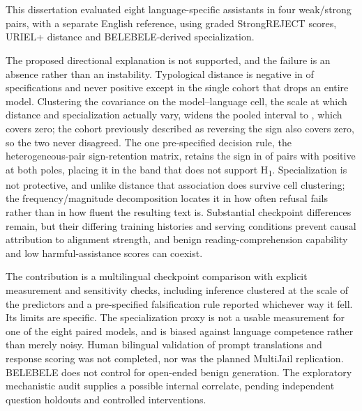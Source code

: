 \chapter{}
\label{chap:conclusion}

This dissertation evaluated eight language-specific assistants in four weak/strong pairs, with a separate English reference, using graded StrongREJECT scores, URIEL+ distance and BELEBELE-derived specialization.

The proposed directional explanation is not supported, and the failure is an absence rather than an instability. Typological distance is negative in \RDistanceNegativeCount{} of \RDistanceSpecCount{} specifications and never positive except in the single cohort that drops an entire model. Clustering the covariance on the model--language cell, the scale at which distance and specialization actually vary, widens the pooled interval to \RDistanceCellInterval{}, which covers zero; the cohort previously described as reversing the sign also covers zero, so the two never disagreed. The one pre-specified decision rule, the heterogeneous-pair sign-retention matrix, retains the sign in \RPreregRetained{} of \RPreregEvaluated{} pairs with \RPreregPositivePairs{} positive at both poles, placing it in the band that does not support H\textsubscript{1}. Specialization is not protective, and unlike distance that association does survive cell clustering; the frequency/magnitude decomposition locates it in how often refusal fails rather than in how fluent the resulting text is. Substantial checkpoint differences remain, but their differing training histories and serving conditions prevent causal attribution to alignment strength, and benign reading-comprehension capability and low harmful-assistance scores can coexist.

The contribution is a multilingual checkpoint comparison with explicit measurement and sensitivity checks, including inference clustered at the scale of the predictors and a pre-specified falsification rule reported whichever way it fell. Its limits are specific. The specialization proxy is not a usable measurement for one of the eight paired models, and is biased against language competence rather than merely noisy. Human bilingual validation of prompt translations and response scoring was not completed, nor was the planned MultiJail replication. BELEBELE does not control for open-ended benign generation. The exploratory mechanistic audit supplies a possible internal correlate, pending independent question holdouts and controlled interventions.

